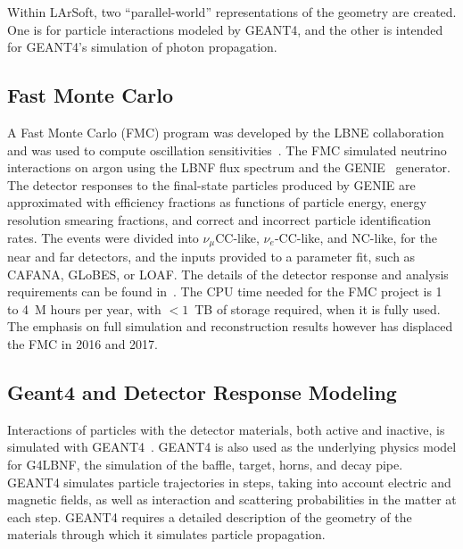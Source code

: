 Within LArSoft, two ``parallel-world'' representations of the geometry are created.  One is for particle interactions
modeled by GEANT4, and the other is intended for GEANT4's simulation of photon propagation.

\subsection{Fast Monte Carlo}

A Fast Monte Carlo (FMC) program was developed by the LBNE collaboration and was used to
compute oscillation sensitivities~\cite{cdr-vol-2}.  The FMC simulated neutrino interactions
on argon using the LBNF flux spectrum and the GENIE~\cite{GENIE} generator.  The detector
responses to the final-state particles produced by GENIE are approximated with efficiency
fractions as functions of particle energy, energy resolution smearing fractions, and
correct and incorrect particle identification rates.  The events were divided into
$\nu_\mu$CC-like, $\nu_e$-CC-like, and NC-like, for the near and far detectors, and the
inputs provided to a parameter fit, such as CAFANA, GLoBES, or LOAF.  The details of the
detector response and analysis requirements can be found in~\cite{cdr-vol-2}.  The CPU time needed
for the FMC project is 1 to 4~M hours per year, with $<1$~TB of storage required, when
it is fully used.  The emphasis on full simulation and reconstruction results however has
displaced the FMC in 2016 and 2017. 

\subsection{Geant4 and Detector Response Modeling}

Interactions of particles with the detector materials, both active and inactive, is simulated with 
GEANT4~\cite{GEANT4:NIM}\cite{GEANT4}.  GEANT4 is also used as the underlying physics model for G4LBNF, the
simulation of the baffle, target, horns, and decay pipe.  GEANT4 simulates particle trajectories in steps,
taking into account electric and magnetic fields, as well as interaction and scattering probabilities in the
matter at each step.  GEANT4 requires a detailed description of the geometry of the materials through which
it simulates particle propagation.

